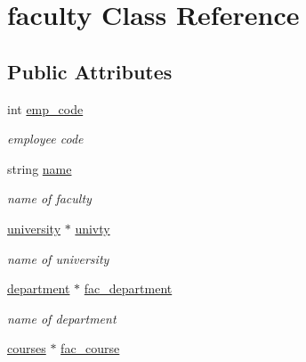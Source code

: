 \hypertarget{classfaculty}{\section{faculty \-Class \-Reference}
\label{classfaculty}
}
\subsection*{\-Public \-Attributes}
\begin{DoxyCompactItemize}
\item 
\hypertarget{classfaculty_a7c471412535bbb28c9ba605675d5d213}{int \hyperlink{classfaculty_a7c471412535bbb28c9ba605675d5d213}{emp\-\_\-code}}\label{classfaculty_a7c471412535bbb28c9ba605675d5d213}

\begin{DoxyCompactList}\small\item\em employee code \end{DoxyCompactList}\item 
\hypertarget{classfaculty_a76a001efba690bd4ba42e33f9859f12e}{string \hyperlink{classfaculty_a76a001efba690bd4ba42e33f9859f12e}{name}}\label{classfaculty_a76a001efba690bd4ba42e33f9859f12e}

\begin{DoxyCompactList}\small\item\em name of faculty \end{DoxyCompactList}\item 
\hypertarget{classfaculty_a197ac47a153493d1bff6ae370f3616e8}{\hyperlink{classuniversity}{university} $\ast$ \hyperlink{classfaculty_a197ac47a153493d1bff6ae370f3616e8}{univty}}\label{classfaculty_a197ac47a153493d1bff6ae370f3616e8}

\begin{DoxyCompactList}\small\item\em name of university \end{DoxyCompactList}\item 
\hypertarget{classfaculty_ad23982e6610c4dd96660973dd2e24c98}{\hyperlink{classdepartment}{department} $\ast$ \hyperlink{classfaculty_ad23982e6610c4dd96660973dd2e24c98}{fac\-\_\-department}}\label{classfaculty_ad23982e6610c4dd96660973dd2e24c98}

\begin{DoxyCompactList}\small\item\em name of department \end{DoxyCompactList}\item 
\hypertarget{classfaculty_a98599e58b559bbef8e4ea1f9c5cecc39}{\hyperlink{classcourses}{courses} $\ast$ \hyperlink{classfaculty_a98599e58b559bbef8e4ea1f9c5cecc39}{fac\-\_\-course}}\label{classfaculty_a98599e58b559bbef8e4ea1f9c5cecc39}


\end{DoxyCompactItemize}

